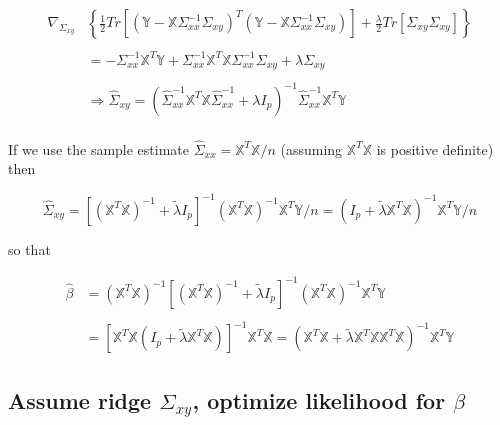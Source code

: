 \documentclass[11pt,]{book}
\theoremstyle{definition}
\theoremstyle{definition}
\theoremstyle{definition}
\theoremstyle{remark}
\begin{document}
\begin{align*}
  \nabla_{\Sigma_{xy}}&\left\{ \frac{1}{2}Tr\left[ \left(\mathbb{Y} - \mathbb{X}\Sigma_{xx}^{-1}\Sigma_{xy} \right)^{T}\left(\mathbb{Y} - \mathbb{X}\Sigma_{xx}^{-1}\Sigma_{xy} \right) \right] + \frac{\lambda}{2}Tr\left[ \Sigma_{xy}\Sigma_{xy} \right] \right\} \\
  & \\
  &= -\Sigma_{xx}^{-1}\mathbb{X}^{T}\mathbb{Y} + \Sigma_{xx}^{-1}\mathbb{X}^{T}\mathbb{X}\Sigma_{xx}^{-1}\Sigma_{xy} + \lambda\Sigma_{xy} \\
  & \\
  &\Rightarrow \hat{\Sigma}_{xy} = \left(\hat{\Sigma}_{xx}^{-1}\mathbb{X}^{T}\mathbb{X}\hat{\Sigma}_{xx}^{-1} + \lambda I_{p} \right)^{-1}\hat{\Sigma}_{xx}^{-1}\mathbb{X}^{T}\mathbb{Y} \\
\end{align*}

If we use the sample estimate
\(\hat{\Sigma}_{xx} = \mathbb{X}^{T}\mathbb{X}/n\) (assuming
\(\mathbb{X}^{T}\mathbb{X}\) is positive definite) then

\[ \hat{\Sigma}_{xy} = \left[\left(\mathbb{X}^{T}\mathbb{X} \right)^{-1} + \tilde{\lambda}I_{p} \right]^{-1}\left(\mathbb{X}^{T}\mathbb{X} \right)^{-1}\mathbb{X}^{T}\mathbb{Y}/n = \left( I_{p} + \tilde{\lambda}\mathbb{X}^{T}\mathbb{X} \right)^{-1}\mathbb{X}^{T}\mathbb{Y}/n \]

so that

\begin{align*}
  \hat{\beta} &= \left( \mathbb{X}^{T}\mathbb{X} \right)^{-1}\left[ \left( \mathbb{X}^{T}\mathbb{X} \right)^{-1} + \tilde{\lambda}I_{p} \right]^{-1}\left( \mathbb{X}^{T}\mathbb{X} \right)^{-1}\mathbb{X}^{T}\mathbb{Y} \\
  & \\
  &= \left[ \mathbb{X}^{T}\mathbb{X}\left( I_{p} + \tilde{\lambda}\mathbb{X}^{T}\mathbb{X} \right) \right]^{-1}\mathbb{X}^{T}\mathbb{X} = \left( \mathbb{X}^{T}\mathbb{X} + \tilde{\lambda}\mathbb{X}^{T}\mathbb{X}\mathbb{X}^{T}\mathbb{X} \right)^{-1}\mathbb{X}^{T}\mathbb{Y}
\end{align*}

\vspace{0.5cm}

\hypertarget{assume-ridge-sigma_xy-optimize-likelihood-for-beta}{%
\subsection{\texorpdfstring{Assume ridge \(\Sigma_{xy}\), optimize
likelihood for
\(\beta\)}{Assume ridge \textbackslash{}Sigma\_\{xy\}, optimize likelihood for \textbackslash{}beta}}\label{assume-ridge-sigma_xy-optimize-likelihood-for-beta}}
\end{document}
